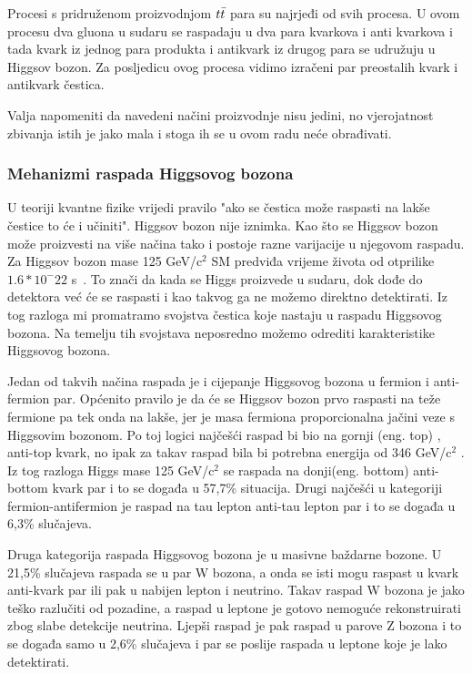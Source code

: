 \documentclass[12pt,a4paper,oneside]{article}
\begin{document}
\begin{linenumbers}
		Procesi s pridruženom proizvodnjom \begin{math}
		\boldmath{t \bar{t}}
		\end{math}  para su najrjeđi od svih procesa. U ovom procesu dva gluona u sudaru se raspadaju u dva para kvarkova i anti kvarkova i tada kvark iz jednog para produkta i antikvark iz drugog para se udružuju u Higgsov bozon. Za posljedicu ovog procesa vidimo izračeni par preostalih kvark i antikvark čestica.
		
		Valja napomeniti da navedeni načini proizvodnje nisu jedini, no vjerojatnost zbivanja istih je jako mala i stoga ih se u ovom radu neće obrađivati.
		
		\subsubsection{Mehanizmi raspada Higgsovog bozona}
		U teoriji kvantne fizike vrijedi pravilo "ako se čestica može raspasti na lakše čestice to će i učiniti". Higgsov bozon nije iznimka. Kao što se Higgsov bozon može proizvesti na više načina tako i postoje razne varijacije u njegovom raspadu. Za Higgsov bozon mase
		125 GeV/c$^2$
		 SM predviđa vrijeme života od otprilike \begin{math}
		1.6 * 10^-22
		\end{math} s~\cite{doktorat}. To znači da kada se Higgs proizvede u sudaru, dok dođe do detektora već će se raspasti i kao takvog ga ne možemo direktno detektirati. Iz tog razloga mi promatramo svojstva čestica koje nastaju u raspadu Higgsovog bozona. Na temelju tih svojstava neposredno možemo odrediti karakteristike Higgsovog bozona.
	
	Jedan od takvih načina raspada je i cijepanje Higgsovog bozona u fermion i anti-fermion par. Općenito pravilo je da će se Higgsov bozon prvo raspasti na teže fermione pa tek onda na lakše, jer je masa fermiona proporcionalna jačini veze s Higgsovim bozonom. Po toj logici najčešći raspad bi bio na gornji (eng. top) , anti-top kvark, no ipak za takav raspad bila bi potrebna energija od 
	346 GeV/c$^2$
	. Iz tog razloga Higgs mase 
	125 GeV/c$^2$
	 se raspada na donji(eng. bottom) anti-bottom kvark par i to se događa u 57,7\% situacija. Drugi najčešći u kategoriji fermion-antifermion je raspad na tau lepton anti-tau lepton par i to se događa u 6,3\% slučajeva.
		
		Druga kategorija raspada Higgsovog bozona je u masivne baždarne bozone. U 21,5\% slučajeva raspada se u par W bozona, a onda se isti mogu raspast u kvark anti-kvark par ili pak u nabijen lepton i neutrino. Takav raspad W bozona je jako teško razlučiti od pozadine, a raspad u leptone je gotovo nemoguće rekonstruirati zbog slabe detekcije neutrina. 
		Ljepši raspad je pak raspad u parove Z bozona i to se događa samo u 2,6\% slučajeva i par se poslije raspada u leptone koje je lako detektirati.
		

\end{linenumbers}
\end{document}
